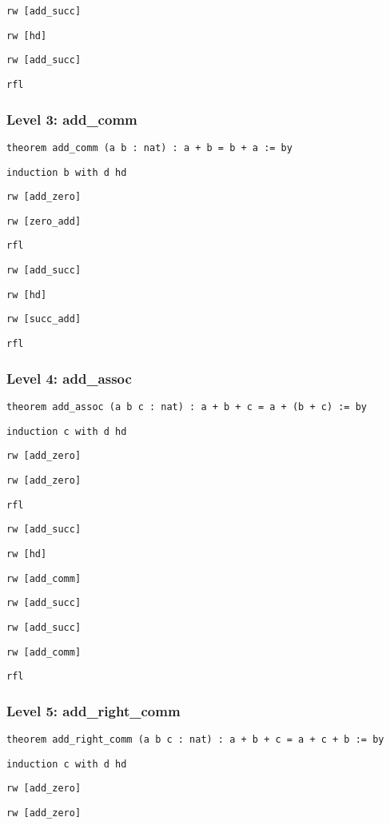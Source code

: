 \documentclass{article}
\begin{document}
\texttt{rw [add\_succ]}

\texttt{rw [hd]}

\texttt{rw [add\_succ]}

\texttt{rfl}

\subsubsection*{Level 3: add\_comm}
\texttt{theorem add\_comm (a b : nat) : a + b = b + a := by}

\texttt{induction b with d hd}

\texttt{rw [add\_zero]}

\texttt{rw [zero\_add]}

\texttt{rfl}

\texttt{rw [add\_succ]}

\texttt{rw [hd]}

\texttt{rw [succ\_add]}

\texttt{rfl}

\subsubsection*{Level 4: add\_assoc}
\texttt{theorem add\_assoc (a b c : nat) : a + b + c = a + (b + c) := by}

\texttt{induction c with d hd}

\texttt{rw [add\_zero]}

\texttt{rw [add\_zero]}

\texttt{rfl}

\texttt{rw [add\_succ]}

\texttt{rw [hd]}

\texttt{rw [add\_comm]}

\texttt{rw [add\_succ]}

\texttt{rw [add\_succ]}

\texttt{rw [add\_comm]}

\texttt{rfl}

\subsubsection*{Level 5: add\_right\_comm}

\texttt{theorem add\_right\_comm (a b c : nat) : a + b + c = a + c + b := by}

\texttt{induction c with d hd}

\texttt{rw [add\_zero]}

\texttt{rw [add\_zero]}
\end{document}
